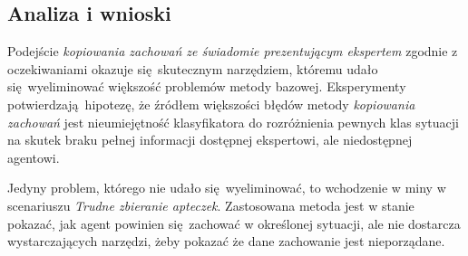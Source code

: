 \subsection{Analiza i wnioski}

Podejście \textit{kopiowania zachowań ze świadomie prezentującym ekspertem} zgodnie z oczekiwaniami okazuje się skutecznym narzędziem, któremu udało się wyeliminować większość problemów metody bazowej. Eksperymenty potwierdzają hipotezę, że źródłem większości błędów metody \textit{kopiowania zachowań} jest nieumiejętność klasyfikatora do rozróżnienia pewnych klas sytuacji na skutek braku pełnej informacji dostępnej ekspertowi, ale niedostępnej agentowi.

Jedyny problem, którego nie udało się wyeliminować, to wchodzenie w miny w scenariuszu \textit{Trudne zbieranie apteczek}. Zastosowana metoda jest w stanie pokazać, jak agent powinien się zachować w określonej sytuacji, ale nie dostarcza wystarczających narzędzi, żeby pokazać że dane zachowanie jest nieporządane.



